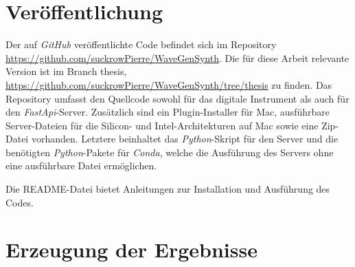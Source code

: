 \documentclass[
  a4paper,  %
  twoside,  %
  bibliography=totoc,
  headsepline,
  cleardoublepage=empty,
  parskip=half,
  draft=false
]{scrbook}
\begin{document}
\appendix
\chapter{Veröffentlichung}
\label{chap:git}
Der auf \emph{GitHub} \cite{noauthor_github_nodate} veröffentlichte Code befindet sich im Repository \url{https://github.com/suckrowPierre/WaveGenSynth}. Die für diese Arbeit relevante Version ist im Branch \glqq thesis\grqq , \url{https://github.com/suckrowPierre/WaveGenSynth/tree/thesis} zu finden. Das Repository umfasst den Quellcode sowohl für das digitale Instrument als auch für den \emph{FastApi}-Server. Zusätzlich sind ein Plugin-Installer für Mac, ausführbare Server-Dateien für die Silicon- und Intel-Architekturen auf Mac sowie eine Zip-Datei vorhanden. Letztere beinhaltet das \emph{Python}-Skript für den Server und die benötigten \emph{Python}-Pakete für \emph{Conda}, welche die Ausführung des Servers ohne eine ausführbare Datei ermöglichen.

Die README-Datei bietet Anleitungen zur Installation und Ausführung des Codes.





\chapter{Erzeugung der Ergebnisse}
\label{chap:prompts}




%
\pagestyle{empty}
\renewcommand*{\chapterpagestyle}{empty}
\Affirmation
\end{document}
